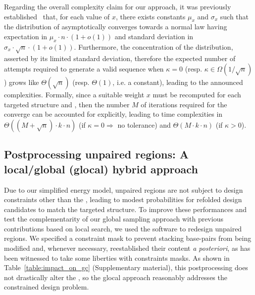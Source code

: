 Regarding the overall complexity claim for our approach, it was previously established~\cite{Waldispuhl2011} that, for each value of $x$, there exists constants $\mu_x$ and $\sigma_x$ such that the distribution of \GCContent asymptotically converges towards a normal law having expectation in $\mu_x\cdot n\cdot(1+o(1))$ and standard deviation in $\sigma_x\cdot\sqrt{n}\cdot(1+o(1))$.
Furthermore, the concentration of the distribution, asserted by its limited standard deviation, therefore the expected number of attempts required to generate a valid sequence when $\kappa=0$ (resp. $\kappa\in\Omega(1/\sqrt n)$) grows like $\Theta(\sqrt{n})$ (resp. $\Theta(1)$, i.e. a constant), leading to the announced complexities. Formally, since a suitable weight $x$ must be recomputed for each targeted structure and \GCContent, then the number $M$ of iterations required for the converge can be accounted for explicitly, leading to time complexities in $\Theta((M+\sqrt{n})\cdot k\cdot n)$ (if $\kappa=0 \Rightarrow$ no tolerance) and $\Theta(M\cdot k\cdot n)$ (if $\kappa>0$).



\subsection{Postprocessing unpaired regions: A local/global (glocal) hybrid approach}
\label{subsec:glocal_method}
Due to our simplified energy model, unpaired regions are not subject to design constraints other than the \GCContent, leading to modest probabilities for refolded design candidates to match the targeted structure. To improve these performances and test the complementarity  of our global sampling approach with previous contributions based on local search, we used the \RNAinverse software to redesign unpaired regions. We specified a constraint mask to prevent stacking base-pairs from being modified and, whenever necessary, reestablished their content {\em a posteriori}, as \RNAinverse has been witnessed to take some liberties with constraints masks. As shown in Table~\ref{table:impact_on_gc} (Supplementary material), this postprocessing does not drastically alter the \GCContent, so the glocal approach reasonably addresses the constrained \GCContent design problem.


